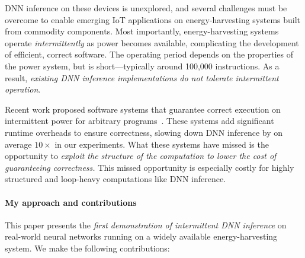 DNN inference on these devices is unexplored, and several challenges
must be overcome to enable emerging IoT applications on
energy-harvesting systems built from commodity components.
%
Most importantly, energy-harvesting systems operate
\emph{intermittently} as power becomes available, complicating the
development of efficient, correct software.
%
The operating period depends on the properties of the
power system, but is short---typically around 100,000 instructions.
%
As a result, \emph{existing DNN inference implementations do not tolerate 
  intermittent operation}.

Recent work proposed software systems that guarantee correct
execution on intermittent power for arbitrary
programs~\cite{dino,ratchet,clank,chain,alpaca,mayfly}.
%
These systems add significant runtime overheads to ensure correctness,
slowing down DNN inference by on average $10\times$ in our experiments.
%
What these systems have missed is the opportunity to \emph{exploit the
  structure of the computation to lower the cost of guaranteeing correctness.}
%
This missed opportunity is especially costly for highly structured and
loop-heavy computations like DNN inference.

\paragraph{My approach and contributions}
%
This paper presents the \emph{first demonstration of intermittent DNN
inference} on real-world neural networks running on a widely
available energy-harvesting system.
%
We make the following contributions:

